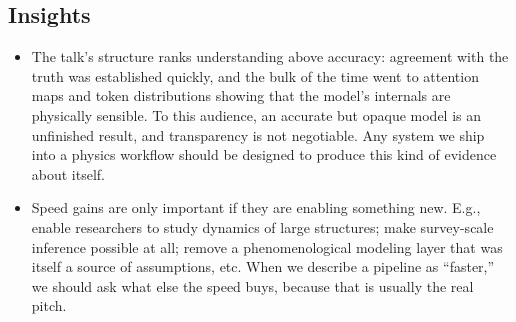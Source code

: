 \documentclass[11pt]{article}
\begin{document}
\subsection*{Insights}
\begin{itemize}
    \item The talk's structure ranks understanding above accuracy: agreement with the truth was established quickly, and the bulk of the time went to attention maps and token distributions showing that the model's internals are physically sensible. To this audience, an accurate but opaque model is an unfinished result, and transparency is not negotiable. Any system we ship into a physics workflow should be designed to produce this kind of evidence about itself.
    \item Speed gains are only important if they are enabling something new. E.g., enable researchers to study dynamics of large structures; make survey-scale inference possible at all; remove a phenomenological modeling layer that was itself a source of assumptions, etc. When we describe a pipeline as ``faster,'' we should ask what else the speed buys, because that is usually the real pitch.
\end{itemize}
\end{document}
